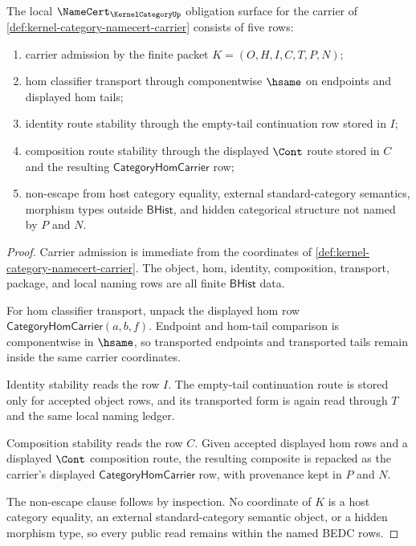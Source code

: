 \begin{theorem}
\label{thm:kernel-category-namecert-obligations}
The local $\NameCert_{\KernelCategoryUp}$ obligation surface for the carrier
of \autoref{def:kernel-category-namecert-carrier} consists of five rows:
\begin{enumerate}
\item carrier admission by the finite packet $K=(O,H,I,C,T,P,N)$;
\item hom classifier transport through componentwise $\hsame$ on endpoints
and displayed hom tails;
\item identity route stability through the empty-tail continuation row stored
in $I$;
\item composition route stability through the displayed $\Cont$ route stored
in $C$ and the resulting $\mathsf{CategoryHomCarrier}$ row;
\item non-escape from host category equality, external standard-category
semantics, morphism types outside $\mathsf{BHist}$, and hidden categorical
structure not named by $P$ and $N$.
\end{enumerate}
\end{theorem}
\begin{proof}
Carrier admission is immediate from the coordinates of
\autoref{def:kernel-category-namecert-carrier}. The object, hom, identity,
composition, transport, package, and local naming rows are all finite
$\mathsf{BHist}$ data.

For hom classifier transport, unpack the displayed hom row
$\mathsf{CategoryHomCarrier}(a,b,f)$. Endpoint and hom-tail comparison is
componentwise in $\hsame$, so transported endpoints and transported tails
remain inside the same carrier coordinates.

Identity stability reads the row $I$. The empty-tail continuation route is
stored only for accepted object rows, and its transported form is again read
through $T$ and the same local naming ledger.

Composition stability reads the row $C$. Given accepted displayed hom rows and
a displayed $\Cont$ composition route, the resulting composite is repacked as
the carrier's displayed $\mathsf{CategoryHomCarrier}$ row, with provenance kept
in $P$ and $N$.

The non-escape clause follows by inspection. No coordinate of $K$ is a host
category equality, an external standard-category semantic object, or a hidden
morphism type, so every public read remains within the named BEDC rows.
\end{proof}

